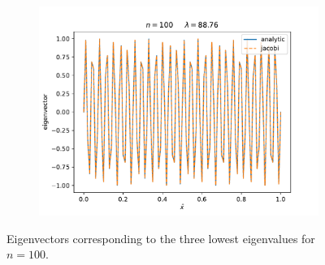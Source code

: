 \documentclass[english,notitlepage]{revtex4-1}  %
\begin{document}
\begin{enumerate}[label= \alph*)]
\begin{figure}[H]
\begin{subfigure}{.5 \textwidth}
        \includegraphics[width=1.12\textwidth]{../figures/eigvec_100_2.pdf}
        \caption{}
        \label{fig:eigvec_100_2}
    \end{subfigure}
    \caption{Eigenvectors corresponding to the three lowest eigenvalues for $n=100$.}
    \label{fig:eigvec_100}
    \end{figure}

\end{enumerate}
\end{document}
